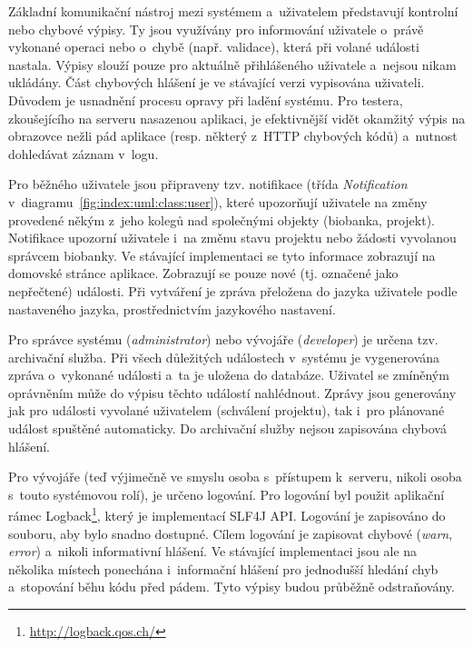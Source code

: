 \documentclass[11pt, draft, oneside]{fithesis2}
\begin{document}
Základní komunikační nástroj mezi systémem a~uživatelem představují kontrolní nebo chybové výpisy. Ty jsou využívány pro informování uživatele o~právě vykonané operaci nebo o~chybě (např. validace), která při volané události nastala. Výpisy slouží pouze pro aktuálně přihlášeného uživatele a~nejsou nikam ukládány. Část chybových hlášení je ve stávající verzi vypisována uživateli. Důvodem je usnadnění procesu opravy při ladění systému. Pro testera, zkoušejícího na serveru nasazenou aplikaci, je efektivnější vidět okamžitý výpis na obrazovce nežli pád aplikace (resp. některý z~HTTP chybových kódů) a~nutnost dohledávat záznam v~logu.

Pro běžného uživatele jsou připraveny tzv. notifikace (třída \textit{Notification} v~diagramu~\ref{fig:index:uml:class:user}), které upozorňují uživatele na změny provedené někým z~jeho kolegů nad společnými objekty (biobanka, projekt). Notifikace upozorní uživatele i~na změnu stavu projektu nebo žádosti vyvolanou správcem biobanky. Ve stávající implementaci se tyto informace zobrazují na domovské stránce aplikace. Zobrazují se pouze nové (tj. označené jako nepřečtené) události. Při vytváření je zpráva přeložena do jazyka uživatele podle nastaveného jazyka, prostřednictvím jazykového nastavení.

Pro správce systému (\textit{administrator}) nebo vývojáře (\textit{developer}) je určena tzv. archivační služba. Při všech důležitých událostech v~systému je vygenerována zpráva o~vykonané události a~ta je uložena do databáze. Uživatel se zmíněným oprávněním může do výpisu těchto událostí nahlédnout. Zprávy jsou generovány jak pro události vyvolané uživatelem (schválení projektu), tak i~pro plánované událost spuštěné automaticky. Do archivační služby nejsou zapisována chybová hlášení.

Pro vývojáře (teď výjimečně ve smyslu osoba s~přístupem k~serveru, nikoli osoba s~touto systémovou rolí), je určeno logování. Pro logování byl použit aplikační rámec Logback\footnote{\url{http://logback.qos.ch/}}, který je implementací SLF4J API. Logování je zapisováno do souboru, aby bylo snadno dostupné. Cílem logování je zapisovat chybové (\textit{warn}, \textit{error}) a~nikoli informativní hlášení. Ve stávající implementaci jsou ale na několika místech ponechána i~informační hlášení pro jednodušší hledání chyb a~stopování běhu kódu před pádem. Tyto výpisy budou průběžně odstraňovány.


\end{document}
